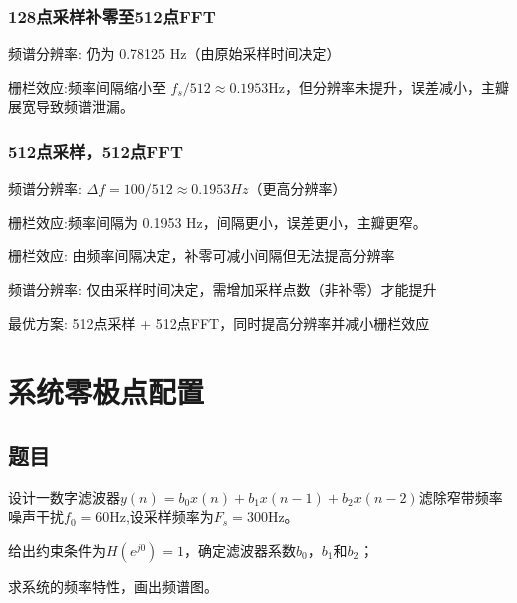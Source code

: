 \documentclass{ctexart}
\begin{document}
			\subsubsection{128点采样补零至512点FFT}
			频谱分辨率: 仍为 0.78125 Hz（由原始采样时间决定）\par
			栅栏效应:频率间隔缩小至 $f_s/512 \approx 0.1953 $Hz，但分辨率未提升，误差减小，主瓣展宽导致频谱泄漏。
			
			\subsubsection{512点采样，512点FFT}
			频谱分辨率: $\Delta f = 100/512 \approx 0.1953 Hz$（更高分辨率）\par
			栅栏效应:频率间隔为 0.1953 Hz，间隔更小，误差更小，主瓣更窄。\par
			
			栅栏效应: 由频率间隔决定，补零可减小间隔但无法提高分辨率\par
			频谱分辨率: 仅由采样时间决定，需增加采样点数（非补零）才能提升\par
			最优方案: 512点采样 + 512点FFT，同时提高分辨率并减小栅栏效应
			
	
	
	
	
	\newpage
	\section{系统零极点配置}
		\subsection{题目}
			设计一数字滤波器$y(n)=b_0x(n)+b_1x(n-1)+b_2x(n-2)$滤除窄带频率噪声干扰$f_0=60$Hz,设采样频率为$F_s=300$Hz。
			\begin{compactenum}
				\item 给出约束条件为$H(e^{j0})=1$，确定滤波器系数$b_0$，$b_1$和$b_2$；
				\item 求系统的频率特性，画出频谱图。
			\end{compactenum}
\end{document}
